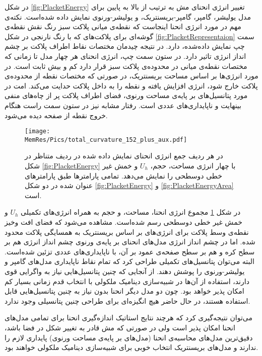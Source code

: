 در شکل
\ref{fig:PlacketEnergy}
تغییر انرژی انحنای مش به ترتیب از بالا به پایین برای مدل یولیشر، گامپر، گامپر-بریسنتریک، و یولیشر-ورنوی نمایش داده شده‌است. نکته‌ی مهم در مورد انرژی انحنا اینجاست که نقطه‌ی میانی پلاکت سبز رنگ نقش نقطه‌ی گوشه‌ای برای پلاکت‌های که با رنگ نارنجی در شکل
\ref{fig:PlacketRepresentaion}
سمت چپ نمایش داده‌شده، دارد. در نتیجه چیدمان مختصات نقاط اطراف پلاکت بر چشم انداز انرژی تاثیر دارد. در ستون سمت چپ، انرژی انحنای هر چهار مدل تا زمانی که مختصات نقطه‌ی میانی در محدود‌ه‌ی پلاکت سبز قرار دارد کم و بیش ثابت است. در مورد انرژی‌ها بر اساس مساحت بریسنتریک، در صورتی که مختصات نقطه از محدوده‌ی پلاکت خارج شود، انرژی افزایش یافته و نقطه را به داخل پلاکت حدایت می‌کند. امت در مورد پتانسیل‌های بر پایه‌ی مساحت ورنوی، فضای اطراف پلاکت پر از چاه‌های منفی بینهایت و ناپایداری‌های عددی‌ است. رفتار مشابه نیز در ستون سمت راست هنگام خروج نقطه از صفحه دیده می‌شود. 


\begin{figure}[htbp]
\begin{center}
\texttt{[image: \\MemRes/Pics/total\_curvature\_152\_plus\_aux.pdf]}
\caption{
در هر ردیف جمع انرژی انحنای نمایش داده شده در ردیف متناظر در  شکل
\ref{fig:PlacketEnergy}
با چهار انرژی مساحت، حجم، 
$U_h$
و خمش غیر خطی دوسطحی را نمایش می‌دهد. تمامی‌ پارامتر‌ها طبق پارامتر‌های عنوان شده در دو شکل 
\ref{fig:PlacketEnergy}
و
\ref{fig:PlacketEnergyArea}
است. 
}
\label{fig:PlacketEnergyAll}
\end{center}
\end{figure}


در شکل 
\ref{fig:PlacketEnergyAll}
مجموع انرژی انحنا، مساحت، و حجم به همراه انرژی‌های تکمیلی 
$U_h$
و خمش غیر خطی دوسطحی رسم شده‌است. مشاهده می‌شود که فضای افت وخیز نقطه‌ی وسط پلاکت برای انرژی‌های بر اساس بریسنتریک به همسایگی پلاکت محدود شده. اما در چشم انداز انرژی مدل‌های انحنای بر پایه‌ی ورنوی چشم انداز انرژی هم بر سطح کره و هم بر سطح صفحه‌ی عمود بر آن، با ناپایداری‌های عددی تزئین شده‌است. البته می‌توان پتانسیل‌های تکمیلی طراحی کرد که تمام نقاط ناپایداری مدل‌های گامپر و یولیشر-ورنوی را پوشش دهند. از آنجایی که چنین پتانسیل‌هایی نیاز به واگرایی قوی دارند، استفاده از آن‌ها در شبیه‌سازی دینامیک ملکولی با انتخاب قدم زمانی بسیار کم امکان پذیر خواهد بود. چون دو مدل دیگر انحنا بدون نیاز به چنین پتانسیل‌هایی قابل استفاده هستند، در حال حاضر هیچ انگیزه‌ای برای طراحی چنین پتانسیلی وجود ندارد.

می‌توان نتیجه‌گیری کرد که هرچند نتایج استاتیک اندازه‌گیری انحنا برای تمامی‌ مدل‌های انحنا امکان پذیر است ولی در صورتی که مش قادر به تغییر شکل در فضا باشد، دقیق‌ترین مدل‌های محاسبه‌ی انحنا (مدل‌های بر پایه‌ی مساحت ورنوی) پایداری لازم را ندارند و مدل‌های بریسنتریک انتخاب خوبی برای شبیه‌سازی دینامیک ملکولی خواهند بود.


